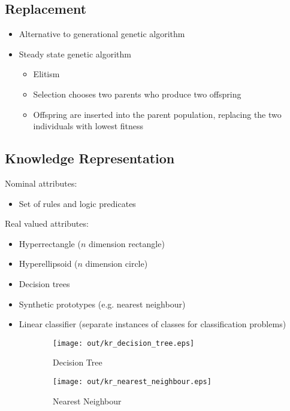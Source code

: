 \documentclass[a4paper]{article}
\begin{document}
\subsection{Replacement}

\begin{itemize}
  \item Alternative to generational genetic algorithm
  \item Steady state genetic algorithm
    \begin{itemize}
      \item Elitism
      \item Selection chooses two parents who produce two offspring
      \item Offspring are inserted into the parent population, replacing the
            two individuals with lowest fitness
    \end{itemize}
\end{itemize}

\subsection{Knowledge Representation}

Nominal attributes:

\begin{itemize}
  \item Set of rules and logic predicates
\end{itemize}

Real valued attributes:

\begin{itemize}
  \item Hyperrectangle ($n$ dimension rectangle)
  \item Hyperellipsoid ($n$ dimension circle)
  \item Decision trees
  \item Synthetic prototypes (e.g. nearest neighbour)
  \item Linear classifier (separate instances of classes for classification
        problems)
\end{itemize}

\begin{figure}[h]
  \centering
  \begin{subfigure}[b]{0.4\textwidth}
    \texttt{[image: out/kr\_decision\_tree.eps]}
    \caption{Decision Tree}
  \end{subfigure}
  \begin{subfigure}[b]{0.4\textwidth}
    \texttt{[image: out/kr\_nearest\_neighbour.eps]}
    \caption{Nearest Neighbour}
  \end{subfigure}
  \caption{}
  \label{fig:ga_knowledge_representations}
\end{figure}
\FloatBarrier
\end{document}

